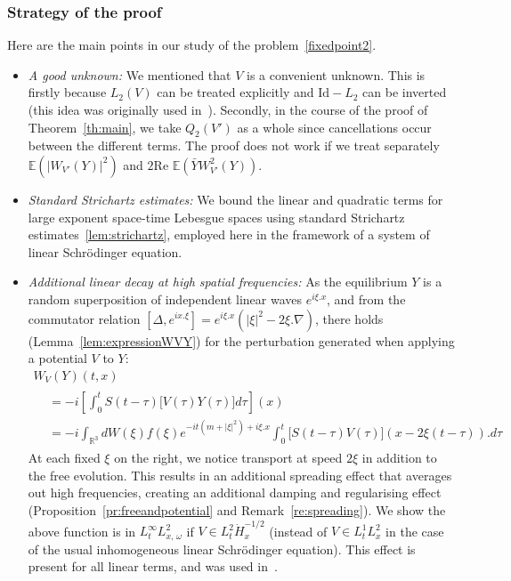 \documentclass[AHL, Unicode, longabstracts,published]{cedram}
\newcommand{\R}{\mathbb{R}}
\newcommand{\E}{\mathbb{E}}
\newcommand{\Id}{\mathrm{Id}}
\begin{document}
\subsubsection{Strategy of the proof}
Here are the main points in our study of the problem~\eqref{fixedpoint2}.
\begin{itemize}
\item \emph{A good unknown:} We mentioned that $V$ is a convenient unknown. This is firstly because $L_2(V)$ can be treated explicitly and $\Id-L_2$ can be inverted (this idea was originally used in~\cite{hainzl2005existence,lewsab2}). Secondly, in the course of the proof of Theorem~\ref{th:main}, we take $Q_2(V')$ as a whole since cancellations occur between the different terms. The proof does not work if we treat separately $\E (|W_{V'}(Y)|^2)$ and $2 \textrm{Re } \E(\bar Y W_{V'}^2 (Y))$.

\item \emph{Standard Strichartz estimates:} We bound the linear and quadratic terms for large exponent space-time Lebesgue spaces using standard Strichartz estimates~\eqref{lem:strichartz}, employed here in the framework of a system of linear Schr\"odinger equation.

\item \emph{Additional linear decay at high spatial frequencies:} As the equilibrium $Y$ is a random superposition of independent linear waves $e^{i\xi.x}$, and from the commutator relation $[\Delta,e^{ix.\xi}]=e^{i\xi.x}(|\xi|^2-2\xi.\nabla)$, there holds (Lemma~\ref{lem:expressionWVY}) for the perturbation generated when applying a potential $V$ to $Y$:
\begin{multline*}
W_V(Y)(t,x)\\
\begin{aligned}
&=-i\left[\int_0^t S(t-\tau) \big[V(\tau) Y(\tau)\big] d\tau\right](x) \\
&=-i \int_{\R^3} dW(\xi) f(\xi) e^{-it\left(m+ |\xi|^2\right)+i\xi.x} \int_{0}^t \big[S (t-\tau) V(\tau)\big](x-2\xi (t-\tau)).d\tau
\end{aligned}
\end{multline*}
At each fixed $\xi$ on the right, we notice transport at speed $2\xi$ in addition to the free evolution. This results in an additional spreading effect that averages out high frequencies, creating an additional damping and regularising effect (Proposition~\ref{pr:freeandpotential} and Remark~\ref{re:spreading}). We show the above function is in $L^{\infty}_tL^2_{x,\,\omega}$ if $V\in L^{2}_t\dot H^{-1/2}_x$ (instead of $V\in L^1_tL^2_x$ in the case of the usual inhomogeneous linear Schr\"odinger equation). This effect is present for all linear terms, and was used in~\cite{CodS}.


\end{itemize}
\end{document}
